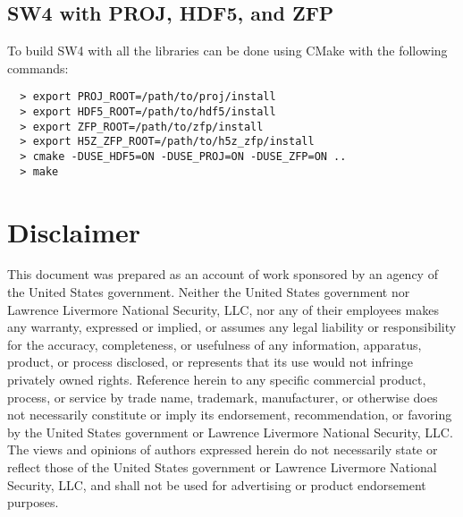 \documentclass[11pt]{article}
\begin{document}
\subsection{SW4 with PROJ, HDF5, and ZFP}
To build SW4 with all the libraries can be done using CMake with the following commands:

\begin{verbatim}
  > export PROJ_ROOT=/path/to/proj/install
  > export HDF5_ROOT=/path/to/hdf5/install
  > export ZFP_ROOT=/path/to/zfp/install
  > export H5Z_ZFP_ROOT=/path/to/h5z_zfp/install
  > cmake -DUSE_HDF5=ON -DUSE_PROJ=ON -DUSE_ZFP=ON ..
  > make
\end{verbatim}



\section{Disclaimer} 
This document was prepared as an account of work sponsored by an agency of the United States
government. Neither the United States government nor Lawrence Livermore National Security, LLC, nor
any of their employees makes any warranty, expressed or implied, or assumes any legal liability or
responsibility for the accuracy, completeness, or usefulness of any information, apparatus, product,
or process disclosed, or represents that its use would not infringe privately owned
rights. Reference herein to any specific commercial product, process, or service by trade name,
trademark, manufacturer, or otherwise does not necessarily constitute or imply its endorsement,
recommendation, or favoring by the United States government or Lawrence Livermore National Security,
LLC. The views and opinions of authors expressed herein do not necessarily state or reflect those of
the United States government or Lawrence Livermore National Security, LLC, and shall not be used for
advertising or product endorsement purposes. 



 
\end{document}
